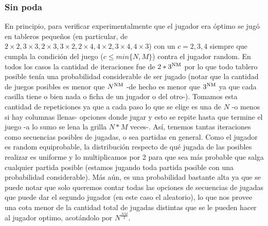\documentclass[A4paper,oneside,fleqn,11pt]{article}
\theoremstyle{definition}
\begin{document}
\subsubsection{Sin poda}
En principio, para verificar experimentalmente que el jugador era óptimo se jugó en tableros pequeños (en particular, de $2\times2, 3\times3, 2\times3, 3\times2, 2\times4, 4\times2, 3\times4, 4\times3$) con un $c=2, 3, 4$ siempre que cumpla la condición del juego ($c\leq min\{N,M\}$) contra el jugador random. En todos los casos la cantidad de iteraciones fue de $2*3\textsuperscript{NM}$ por lo que todo tablero posible tenía una probabilidad considerable de ser jugado (notar que la cantidad de juegos posibles es menor que $N\textsuperscript{NM}$ -de hecho es menor que $3\textsuperscript{NM}$ ya que cada casilla tiene o bien nada o ficha de un jugador o del otro-). Tomamos esta cantidad de repeticiones ya que a cada paso lo que se elige es una de $N$ -o menos si hay columnas llenas- opciones donde jugar y esto se repite hasta que termine el juego -a lo sumo se lena la grilla $N*M$ veces-. Así, tenemos tantas iteraciones como secuencias posibles de jugadas, o sea partidas en general. Como el jugador es random equiprobable, la distribución respecto de qué jugada de las posibles realizar es uniforme y lo multiplicamos por 2 para que sea más probable que salga cualquier partida posible (estamos jugando toda partida posible con una probabilidad considerable). Más aún, es una probabilidad bastante alta ya que se puede notar que solo queremos contar todas las opciones de secuencias de jugadas que puede dar el segundo jugador (en este caso el aleatorio), lo que nos provee una cota menor de la cantidad total de jugadas distintas que se le pueden hacer al jugador optimo, acotándolo por $N^{ \frac{NM}{2} }$.
\end{document}
